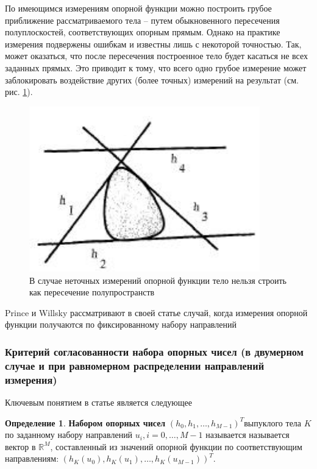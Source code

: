 \documentclass[a4paper, 12pt, titlepage]{article}
\theoremstyle{definition}
\newtheorem{SmartDefinition}{Определение}
\theoremstyle{plain}
\theoremstyle{plain}
\begin{document}
По имеющимся измерениям опорной функции можно построить грубое приближение
рассматриваемого тела -- путем обыкновенного пересечения полуплоскостей,
соответствующих опорным прямым. Однако на практике измерения подвержены
ошибкам и известны лишь с некоторой точностью. Так, может оказаться, что
после пересечения построенное тело будет касаться не всех заданных прямых.
Это приводит к тому, что всего одно грубое измерение может заблокировать
воздействие других (более точных) измерений на результат (см. рис.
\ref{inconsistent}).

\begin{figure}[ht]
    \includegraphics[width=10cm]{images/inconsistent-support-planes.jpg}
    \caption{В случае неточных измерений опорной функции тело нельзя строить
    как пересечение полупространств}
    \label{inconsistent}
\end{figure}

Prince и Willsky рассматривают в своей статье случай, когда измерения опорной
функции получаются по фиксированному набору направлений

\subsubsection{Критерий согласованности набора опорных чисел (в двумерном
случае и при равномерном распределении направлений измерения)}
\label{sec:support-methods:2d-uniform:criterion}

Ключевым понятием в статье является следующее

\begin{SmartDefinition}
 \label{def:support-vector}
 \textbf{Набором опорных чисел}
 $(h_{0}, h_{1}, \ldots, h_{M - 1})^{T}$выпуклого тела $K$ по заданному набору
 направлений $u_{i}, i = 0, \ldots, M - 1$ называется называется вектор в
 $\mathbb{R}^{M}$, составленный из значений опорной функции по соответствующим
 направлениям: $(h_{K}(u_{0}), h_{K}(u_{1}), \ldots, h_{K}(u_{M - 1}))^{T}$.
\end{SmartDefinition}
\end{document}
